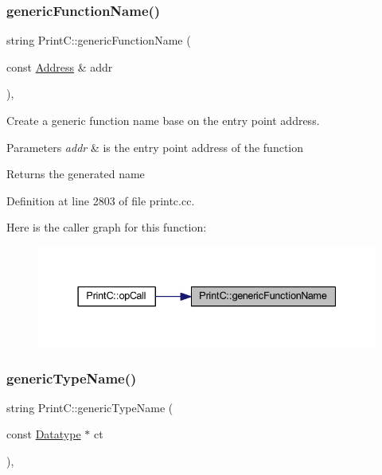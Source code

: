 \subsubsection{\texorpdfstring{genericFunctionName()}{genericFunctionName()}}
{\footnotesize\ttfamily string Print\+C\+::generic\+Function\+Name (\begin{DoxyParamCaption}\item[{const \mbox{\hyperlink{class_address}{Address}} \&}]{addr }\end{DoxyParamCaption})\hspace{0.3cm}{\ttfamily [protected]}, {\ttfamily [virtual]}}



Create a generic function name base on the entry point address. 


\begin{DoxyParams}{Parameters}
{\em addr} & is the entry point address of the function \\
\hline
\end{DoxyParams}
\begin{DoxyReturn}{Returns}
the generated name 
\end{DoxyReturn}


Definition at line 2803 of file printc.\+cc.

Here is the caller graph for this function\+:
\nopagebreak
\begin{figure}[H]
\begin{center}
\leavevmode
\includegraphics[width=337pt]{class_print_c_af262dab8c2593fce9a9bceac82a8eb9c_icgraph}
\end{center}
\end{figure}
\mbox{\label{class_print_c_a9be29ae351e163eeead58aeb5eb5720b}} 
\subsubsection{\texorpdfstring{genericTypeName()}{genericTypeName()}}
{\footnotesize\ttfamily string Print\+C\+::generic\+Type\+Name (\begin{DoxyParamCaption}\item[{const \mbox{\hyperlink{class_datatype}{Datatype}} $\ast$}]{ct }\end{DoxyParamCaption})\hspace{0.3cm}{\ttfamily [protected]}, {\ttfamily [virtual]}}



